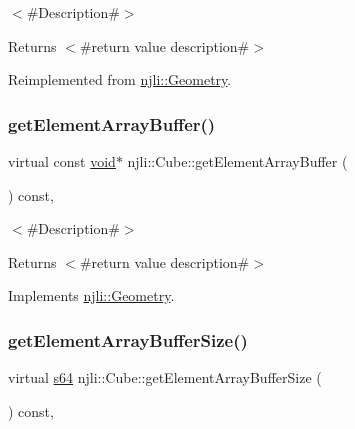 $<$\#\+Description\#$>$

\begin{DoxyReturn}{Returns}
$<$\#return value description\#$>$ 
\end{DoxyReturn}


Reimplemented from \mbox{\hyperlink{classnjli_1_1_geometry_abfa3fe3b5680b7b40c650fdc7a7fb737}{njli\+::\+Geometry}}.

\mbox{\label{classnjli_1_1_cube_a23d0d7188f82ae0b16d79a809b4656ea}} 
\subsubsection{\texorpdfstring{get\+Element\+Array\+Buffer()}{getElementArrayBuffer()}}
{\footnotesize\ttfamily virtual const \mbox{\hyperlink{_thread_8h_af1e856da2e658414cb2456cb6f7ebc66}{void}}$\ast$ njli\+::\+Cube\+::get\+Element\+Array\+Buffer (\begin{DoxyParamCaption}{ }\end{DoxyParamCaption}) const\hspace{0.3cm}{\ttfamily [protected]}, {\ttfamily [virtual]}}

$<$\#\+Description\#$>$

\begin{DoxyReturn}{Returns}
$<$\#return value description\#$>$ 
\end{DoxyReturn}


Implements \mbox{\hyperlink{classnjli_1_1_geometry_ac4edd389ae104da289e2282d780454f0}{njli\+::\+Geometry}}.

\mbox{\label{classnjli_1_1_cube_abf93b9573c3ef1b94809e50774a06379}} 
\subsubsection{\texorpdfstring{get\+Element\+Array\+Buffer\+Size()}{getElementArrayBufferSize()}}
{\footnotesize\ttfamily virtual \mbox{\hyperlink{_util_8h_a4258bfb2c3a440d06c4aaa3c2b450dde}{s64}} njli\+::\+Cube\+::get\+Element\+Array\+Buffer\+Size (\begin{DoxyParamCaption}{ }\end{DoxyParamCaption}) const\hspace{0.3cm}{\ttfamily [protected]}, {\ttfamily [virtual]}}

